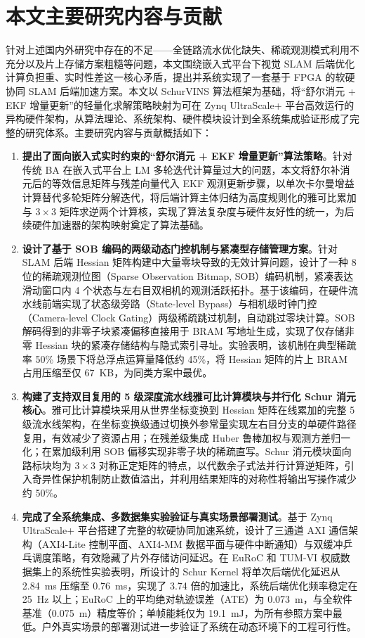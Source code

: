 \section{本文主要研究内容与贡献}

针对上述国内外研究中存在的不足——全链路流水优化缺失、稀疏观测模式利用不充分以及片上存储方案粗糙等问题，本文围绕嵌入式平台下视觉 SLAM 后端优化计算负担重、实时性差这一核心矛盾，提出并系统实现了一套基于 FPGA 的软硬协同 SLAM 后端加速方案。本文以 SchurVINS 算法框架为基础，将“舒尔消元 + EKF 增量更新”的轻量化求解策略映射为可在 Zynq UltraScale+ 平台高效运行的异构硬件架构，从算法理论、系统架构、硬件模块设计到全系统集成验证形成了完整的研究体系。主要研究内容与贡献概括如下：

\begin{enumerate}
    \item \textbf{提出了面向嵌入式实时约束的“舒尔消元 + EKF 增量更新”算法策略}。针对传统 BA 在嵌入式平台上 LM 多轮迭代计算量过大的问题，本文将舒尔补消元后的等效信息矩阵与残差向量代入 EKF 观测更新步骤，以单次卡尔曼增益计算替代多轮矩阵分解迭代，将后端计算主体归结为高度规则化的雅可比累加与 $3 \times 3$ 矩阵求逆两个计算核，实现了算法复杂度与硬件友好性的统一，为后续硬件加速器的架构映射奠定了算法基础。

    \item \textbf{设计了基于 SOB 编码的两级动态门控机制与紧凑型存储管理方案}。针对 SLAM 后端 Hessian 矩阵构建中大量零块导致的无效计算问题，设计了一种 8 位的稀疏观测位图（Sparse Observation Bitmap, SOB）编码机制，紧凑表达滑动窗口内 4 个状态与左右目双相机的观测活跃拓扑。基于该编码，在硬件流水线前端实现了状态级旁路（State-level Bypass）与相机级时钟门控（Camera-level Clock Gating）两级稀疏跳过机制，自动跳过零块计算。SOB 解码得到的非零子块紧凑偏移直接用于 BRAM 写地址生成，实现了仅存储非零 Hessian 块的紧凑存储结构与隐式索引寻址。实验表明，该机制在典型稀疏率 50\% 场景下将总浮点运算量降低约 45\%，将 Hessian 矩阵的片上 BRAM 占用压缩至仅 67~KB，为同类方案中最优。

    \item \textbf{构建了支持双目复用的 5 级深度流水线雅可比计算模块与并行化 Schur 消元核心}。雅可比计算模块采用从世界坐标变换到 Hessian 矩阵在线累加的完整 5 级流水线架构，在坐标变换级通过切换外参常量实现左右目分支的单硬件路径复用，有效减少了资源占用；在残差级集成 Huber 鲁棒加权与观测方差归一化；在累加级利用 SOB 偏移实现非零子块的稀疏直写。Schur 消元模块面向路标块均为 $3 \times 3$ 对称正定矩阵的特点，以代数余子式法并行计算逆矩阵，引入奇异性保护机制防止数值溢出，并利用结果矩阵的对称性将输出写操作减少约 50\%。

    \item \textbf{完成了全系统集成、多数据集实验验证与真实场景部署测试}。基于 Zynq UltraScale+ 平台搭建了完整的软硬协同加速系统，设计了三通道 AXI 通信架构（AXI4-Lite 控制平面、AXI4-MM 数据平面与硬件中断通知）与双缓冲乒乓调度策略，有效隐藏了片外存储访问延迟。在 EuRoC 和 TUM-VI 权威数据集上的系统性实验表明，所设计的 Schur Kernel 将单次后端优化延迟从 2.84~ms 压缩至 0.76~ms，实现了 3.74 倍的加速比，系统后端优化频率稳定在 25~Hz 以上；EuRoC 上的平均绝对轨迹误差（ATE）为 0.073~m，与全软件基准（0.075~m）精度等价；单帧能耗仅为 19.1~mJ，为所有参照方案中最低。户外真实场景的部署测试进一步验证了系统在动态环境下的工程可行性。
\end{enumerate}

